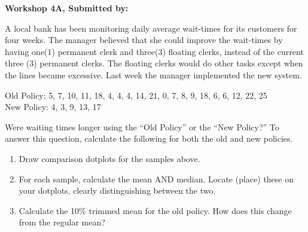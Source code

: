 \documentclass[11pt]{book}\usepackage[]{graphicx}\usepackage[]{color}
\begin{document}
\begin{exercises}
\begin{exercise}
    \begin{center}
\begin{flushleft}\textbf{\large \hfill Workshop 4A, Submitted by: }\end{flushleft}

\end{center}

A local bank has been monitoring daily average wait-times for its customers for four weeks. The manager believed that she could improve the wait-times by having one(1) permanent clerk and three(3) floating clerks, instead of the current three (3) permanent clerks. The floating clerks would do other tasks except when the lines became excessive. Last week the manager implemented the new system.

Old Policy:   5, 7, 10, 11, 18, 4, 4, 4, 14, 21, 0, 7, 8, 9, 18, 6, 6, 12, 22, 25 \\
New Policy: 4, 3, 9, 13, 17

Were waiting times longer using the ``Old Policy'' or the ``New Policy?''  To answer this question, calculate the following for both the old and new policies.

\begin{enumerate}
  \item Draw comparison dotplots for the samples above.
  \item For each sample, calculate the mean AND median.  Locate (place) these on your dotplots, clearly distinguishing between the two.
  \item Calculate the 10\% trimmed mean for the old policy.  How does this change from the regular mean?
\end{enumerate}


\end{exercise}
\end{exercises}
\end{document}
